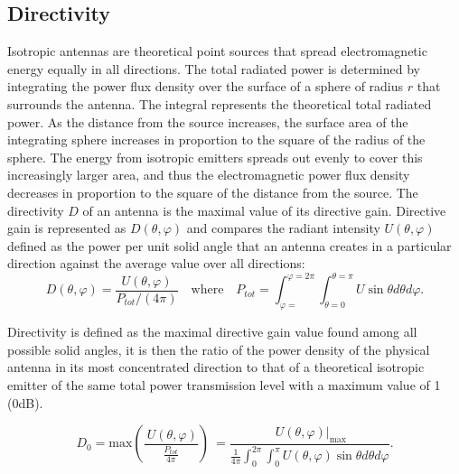 \subsection{Directivity}

Isotropic antennas are theoretical point sources that spread electromagnetic energy equally in all directions. The total radiated power is determined by integrating the power flux density over the surface of a sphere of radius $r$ that surrounds the antenna. The integral represents the theoretical total radiated power. As the distance from the source increases, the surface area of the integrating sphere increases in proportion to the square of the radius of the sphere. The energy from isotropic emitters spreads out evenly to cover this increasingly larger area, and thus the electromagnetic power flux density decreases in proportion to the square of the distance from the source.
The directivity  $D$  of an antenna is the maximal value of its directive gain. Directive gain is represented as  $D \left(  \theta , \varphi  \right)$  and compares the radiant intensity  $U \left(  \theta , \varphi  \right)$  defined as the power per unit solid angle that an antenna creates in a particular direction against the average value over all directions:
\begin{equation}
D \left(  \theta , \varphi  \right) = \frac{ U \left(  \theta , \varphi  \right) }{P_{tot}/ \left( 4 \pi  \right) } \quad  \mbox{where} \quad  P_{tot}= \int_{ \varphi =}^{ \varphi =2 \pi } \int_{ \theta =0}^{ \theta = \pi }U\sin  \theta d \theta d \varphi.
\label{directivity}
\end{equation}

Directivity is defined as the maximal directive gain value found among all possible solid angles, it is then the ratio of the power density of the physical antenna in its most concentrated direction to that of a theoretical isotropic emitter of the same total power transmission level with a maximum value of 1 (0dB).

\begin{equation}
D_{0} = \mbox{max} \left( \frac{~U \left(  \theta , \varphi  \right) }{\frac{P_{tot}}{4 \pi }} \right) ~=\frac{~  U \left(  \theta , \varphi  \right)  \vert_{\max }}{\frac{1}{4 \pi } \int_{0}^{2 \pi } \int _{0}^{ \pi }U \left(  \theta , \varphi  \right) \sin  \theta d \theta d \varphi }.
\end{equation}





